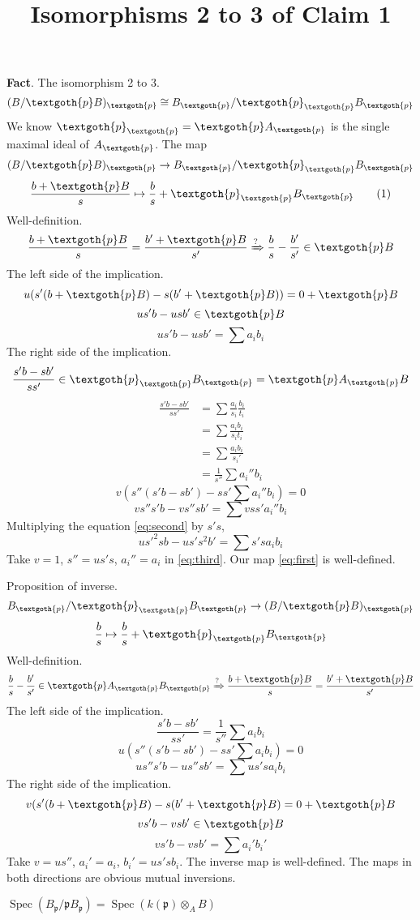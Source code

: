 \documentclass{article}
\title{Isomorphisms 2 to 3 of Claim 1}
\newcommand{\mf}{\mathfrak}
\newcommand{\ppp}{\mf p}
\newcommand{\Spec}{\operatorname{Spec}}
\begin{document}
\maketitle

\textbf{Fact}. The isomorphism 2 to 3.
\[
  (B/\textgoth{p}B)_\textgoth{p} \cong 
  B_\textgoth{p} / \textgoth{p}_\textgoth{p} B_\textgoth{p}
\]
We know $\textgoth{p}_\textgoth{p} = \textgoth{p}A_\textgoth{p}$ is the single maximal ideal of $A_\textgoth{p}$. The map
\[
(B/\textgoth{p}B)_\textgoth{p} \rightarrow B_\textgoth{p}/\textgoth{p}_\textgoth{p}B_\textgoth{p}
\]
\[
\frac{b + \textgoth{p}B}{s} \mapsto \frac{b}{s} + \textgoth{p}_\textgoth{p}B_\textgoth{p}
\tag{1}\label{eq:first}
\]
Well-definition.
\[
\frac{b + \textgoth{p}B}{s} = \frac{b' + \textgoth{p}B}{s'}
\xRightarrow{?}
\frac{b}{s} - \frac{b'}{s'} \in \textgoth{p}B
\]
The left side of the implication.
\[
u(s'(b + \textgoth{p}B) - s(b' + \textgoth{p}B)) = 0 + \textgoth{p}B
\]
\[
us'b - usb' \in \textgoth{p}B
\]
\[
us'b - usb' = \sum a_i b_i
\tag{2}\label{eq:second}
\]
The right side of the implication.
\[
\frac{s'b - sb'}{ss'} \in \textgoth{p}_\textgoth{p}B_\textgoth{p} = \textgoth{p}A_\textgoth{p}B
\]
\begin{align*}
\frac{s'b - sb'}{ss'} & = \sum \frac{a_i}{s_i}\frac{b_i}{t_i} \\
& = \sum \frac{a_ib_i}{s_it_i} \\
& = \sum \frac{a_ib_i}{s_i'} \\
& = \frac{1}{s''} \sum a_i''b_i
\tag{3}\label{eq:third}
\end{align*}
\[
v(s''(s'b - sb') - ss' \sum a_i'' b_i) = 0
\]
\[
vs''s'b - vs''sb' = \sum vss'a_i''b_i
\]
Multiplying the equation \eqref{eq:second} by $s's$,
\[
us'^2sb - us's^2b' = \sum s'sa_ib_i
\]
Take $v = 1$, $s'' = u s's$, $a_i'' = a_i$ in \eqref{eq:third}. Our map \eqref{eq:first} is well-defined.

\vspace{4mm}
Proposition of inverse.
\[
B_\textgoth{p}/\textgoth{p}_\textgoth{p}B_\textgoth{p} \rightarrow (B/\textgoth{p}B)_\textgoth{p}
\]
\[
\frac{b}{s} \mapsto \frac{b}{s} + \textgoth{p}_\textgoth{p}B_\textgoth{p} 
\]
Well-definition.
\[
\frac{b}{s} - \frac{b'}{s'} \in \textgoth{p}A_\textgoth{p}B_\textgoth{p}
\xRightarrow{?}
\frac{b + \textgoth{p}B}{s} = \frac{b' + \textgoth{p}B}{s'}
\]
The left side of the implication.
\[
\frac{s'b - sb'}{ss'} = \frac{1}{s''}\sum a_i b_i
\]
\[
u(s''(s'b - sb') - ss' \sum a_ib_i) = 0
\]
\[
us''s'b - us''sb' = \sum us'sa_ib_i
\]
The right side of the implication.
\[
v(s'(b + \textgoth{p}B) - s(b' + \textgoth{p}B) = 0 + \textgoth{p}B
\]
\[
vs'b - vsb' \in \textgoth{p}B
\]
\[
vs'b - vsb' = \sum a_i'b_i'
\]
Take $v = us''$, $a_i' = a_i$, $b_i' = us'sb_i$. The inverse map is well-defined. The maps in both directions are obvious mutual inversions.

$\Spec(B_\ppp/\ppp B_\ppp) = \Spec(k(\ppp) \otimes_A B)$ 
\end{document}
